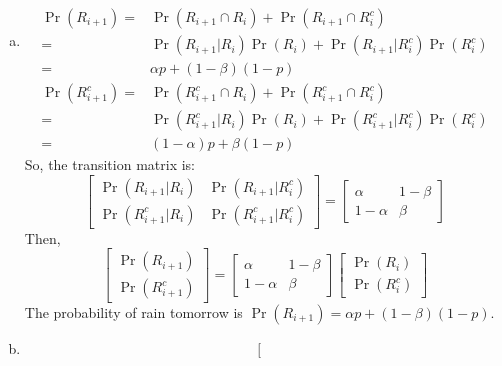 \documentclass[14pt]{elegantbook}
\begin{document}
    \begin{solution}
        \begin{enumerate}[(a)]
            \item 
            \begin{align*}
                \Pr(R_{i+1})=&\Pr(R_{i+1}\cap R_i)+\Pr(R_{i+1}\cap R_i^c)\\
                =&\Pr(R_{i+1}|R_i)\Pr(R_i)+\Pr(R_{i+1}|R_i^c)\Pr(R_i^c)\\
                =&\alpha p+(1-\beta)(1-p)
            \end{align*}
            \begin{align*}
                \Pr(R_{i+1}^c)=&\Pr(R_{i+1}^c\cap R_i)+\Pr(R_{i+1}^c\cap R_i^c)\\
                =&\Pr(R_{i+1}^c|R_i)\Pr(R_i)+\Pr(R_{i+1}^c|R_i^c)\Pr(R_i^c)\\
                =&(1-\alpha) p+\beta(1-p)
            \end{align*}
            So, the transition matrix is: 
            \[\begin{bmatrix}
                \Pr(R_{i+1}|R_i)&\Pr(R_{i+1}|R_i^c)\\
                \Pr(R_{i+1}^c|R_i)&\Pr(R_{i+1}^c|R_i^c)
            \end{bmatrix}=\begin{bmatrix}
                \alpha&1-\beta\\
                1-\alpha&\beta
            \end{bmatrix}\]
            Then, \[\left[
                \begin{matrix}
                    \Pr(R_{i+1})\\
                    \Pr(R_{i+1}^c)
                \end{matrix}\right]=\begin{bmatrix}
                    \alpha&1-\beta\\
                    1-\alpha&\beta
                \end{bmatrix}\begin{bmatrix}
                    \Pr(R_i)\\
                    \Pr(R_i^c)
                \end{bmatrix}
            \]
            The probability of rain tomorrow is $\Pr(R_{i+1})=\alpha p+(1-\beta)(1-p)$.
            \item \begin{align*}
                \left[\begin{matrix}

\end{matrix}
\end{align*}
\end{enumerate}
\end{solution}
\end{document}
